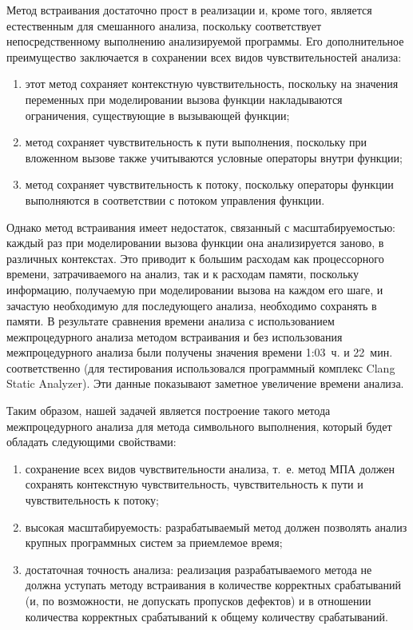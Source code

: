 Метод встраивания достаточно прост в реализации и, кроме того, является естественным для смешанного анализа, поскольку соответствует непосредственному выполнению анализируемой программы. Его дополнительное преимущество заключается в сохранении всех видов чувствительностей анализа:

\begin{enumerate}
 \item этот метод сохраняет контекстную чувствительность, поскольку на значения переменных при моделировании вызова функции накладываются ограничения, существующие в вызывающей функции;
 \item метод сохраняет чувствительность к пути выполнения, поскольку при вложенном вызове также учитываются условные операторы внутри функции;
 \item метод сохраняет чувствительность к потоку, поскольку операторы функции выполняются в соответствии с потоком управления функции.
\end{enumerate}


Однако метод встраивания имеет недостаток, связанный с масштабируемостью: каждый раз при моделировании вызова функции она анализируется заново, в различных контекстах. Это приводит к большим расходам как процессорного времени, затрачиваемого на анализ, так и к расходам памяти, поскольку информацию, получаемую при моделировании вызова на каждом его шаге, и зачастую необходимую для последующего анализа, необходимо сохранять в памяти. В результате сравнения времени анализа с использованием межпроцедурного анализа методом встраивания и без использования межпроцедурного анализа были получены значения времени 1:03~ч. и 22~мин. соответственно (для тестирования использовался программный комплекс Clang Static Analyzer). Эти данные показывают заметное увеличение времени анализа.

Таким образом, нашей задачей является построение такого метода межпроцедурного анализа для метода символьного выполнения, который будет обладать следующими свойствами:

\begin{enumerate}
 \item сохранение всех видов чувствительности анализа, т.~е. метод МПА должен сохранять контекстную чувствительность, чувствительность к пути и чувствительность к потоку;
 \item высокая масштабируемость: разрабатываемый метод должен позволять анализ крупных программных систем за приемлемое время;
 \item достаточная точность анализа: реализация разрабатываемого метода не должна уступать методу встраивания в количестве корректных срабатываний (и, по возможности, не допускать пропусков дефектов) и в отношении количества корректных срабатываний к общему количеству срабатываний.
\end{enumerate}


